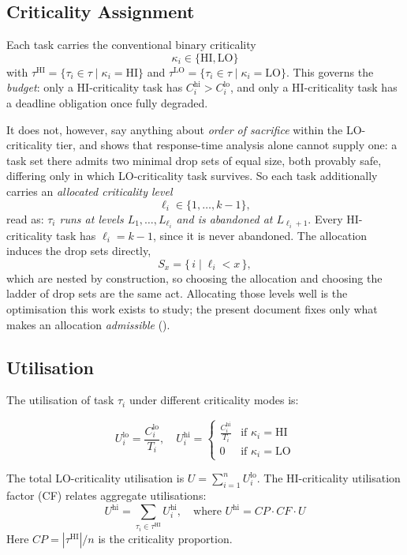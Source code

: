\documentclass{article}
\begin{document}
\subsection{Criticality Assignment}
\label{sec:criticality-levels}

Each task carries the conventional binary criticality
\[
\kappa_i \in \{\mathrm{HI}, \mathrm{LO}\}
\]
with $\tau^{\mathrm{HI}} = \{\tau_i \in \tau \mid \kappa_i = \mathrm{HI}\}$ and
$\tau^{\mathrm{LO}} = \{\tau_i \in \tau \mid \kappa_i = \mathrm{LO}\}$. This
governs the \emph{budget}: only a HI-criticality task has
$C_i^{\mathrm{hi}} > C_i^{\mathrm{lo}}$, and only a HI-criticality task has a
deadline obligation once fully degraded.

It does not, however, say anything about \emph{order of sacrifice} within the
LO-criticality tier, and  shows that response-time analysis
alone cannot supply one: a task set there admits two minimal drop sets of equal
size, both provably safe, differing only in which LO-criticality task survives.
So each task additionally carries an \emph{allocated criticality level}
\[
\ell_i \in \{1, \dots, k-1\},
\]
read as: \emph{$\tau_i$ runs at levels $L_1, \dots, L_{\ell_i}$ and is
abandoned at $L_{\ell_i + 1}$}. Every HI-criticality task has
$\ell_i = k-1$, since it is never abandoned. The allocation induces the drop
sets directly,
\[
S_x = \{\, i \mid \ell_i < x \,\},
\]
which are nested by construction, so choosing the allocation and choosing the
ladder of drop sets are the same act. Allocating those levels well is the
optimisation this work exists to study; the present document fixes only what
makes an allocation \emph{admissible} ().

\subsection{Utilisation}

The utilisation of task $\tau_i$ under different criticality modes is:

\[
U_i^{\mathrm{lo}} = \frac{C_i^{\mathrm{lo}}}{T_i}, \quad
U_i^{\mathrm{hi}} = \begin{cases}
    \frac{C_i^{\mathrm{hi}}}{T_i} & \text{if } \kappa_i = \mathrm{HI} \\
    0 & \text{if } \kappa_i = \mathrm{LO}
\end{cases}
\]

The total LO-criticality utilisation is $U = \sum_{i=1}^n U_i^{\mathrm{lo}}$.
The HI-criticality utilisation factor (CF) relates aggregate utilisations:
\[
U^{\mathrm{hi}} = \sum_{\tau_i \in \tau^{\mathrm{HI}}} U_i^{\mathrm{hi}}, \quad
\text{where } U^{\mathrm{hi}} = CP \cdot CF \cdot U
\]
Here $CP = |\tau^{\mathrm{HI}}| / n$ is the criticality proportion.
\end{document}
